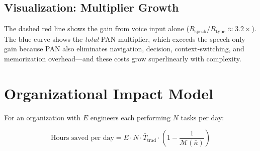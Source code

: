 \documentclass[11pt, a4paper]{article}
\begin{document}
\subsection{Visualization: Multiplier Growth}

\begin{center}
\end{center}

The dashed red line shows the gain from voice input alone ($R_{\text{speak}} / R_{\text{type}} \approx 3.2\times$). The blue curve shows the \emph{total} PAN multiplier, which exceeds the speech-only gain because PAN also eliminates navigation, decision, context-switching, and memorization overhead---and these costs grow superlinearly with complexity.

\section{Organizational Impact Model}

For an organization with $E$ engineers each performing $N$ tasks per day:

\begin{equation}
  \text{Hours saved per day} = E \cdot N \cdot \bar{T}_{\text{trad}} \cdot \left(1 - \frac{1}{\mathcal{M}(\bar{\kappa})}\right)
\end{equation}
\end{document}
